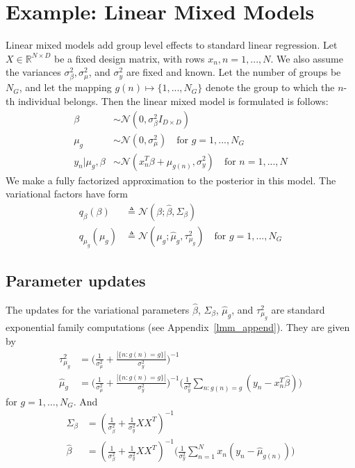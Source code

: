 \documentclass{article}
\begin{document}
\section{Example: Linear Mixed Models} 
Linear mixed models add group level effects to standard linear regression. Let $X\in \mathbb{R}^{N\times D}$ be a fixed design matrix, with rows $x_n, n = 1,..., N$. We also assume the variances $\sigma^2_\beta, \sigma^2_\mu$, and $\sigma^2_y$ are fixed and known. Let the number of groups be $N_G$, and let the mapping $g(n)\mapsto \{1, ..., N_G\}$ denote the group to which the $n$-th individual belongs. Then the linear mixed model is formulated is follows: 
\begin{align}
\beta &\sim \mathcal N(0, \sigma^2_\beta I_{D\times D}) \label{eq:lmm_prior1}\\
\mu_g &\sim \mathcal N(0, \sigma^2_\mu) \quad \text{for $g= 1, ..., N_G$} \label{eq:lmm_prior2}\\
y_n | \mu_g, \beta &\sim \mathcal N (x_n^T\beta + \mu_{g(n)}, \sigma^2_y)\quad \text{for $n = 1, ..., N$}\label{eq:lmm_LH}
\end{align}
We make a fully factorized approximation to the posterior in this model. The variational factors have form 
\begin{align}
q_\beta(\beta) &\triangleq \mathcal N (\beta; \hat \beta, \Sigma_\beta)\\
q_{\mu_g}(\mu_g) &\triangleq \mathcal{N}(\mu_g; \hat\mu_g, \tau^2_{\mu_g}) \quad \text{for }g = 1, ..., N_G
\end{align}

\subsection{Parameter updates}
The updates for the variational parameters $\hat\beta$, $\Sigma_\beta$, $\hat\mu_g$, and $\tau^2_{\mu_g}$ are standard exponential family computations (see Appendix~\ref{lmm_append}). They are given by 
\begin{align}
{\tau^2_{\mu_g}} &= \Big(\frac{1}{\sigma^2_\mu} + \frac{|\{n : g(n) = g\}|}{\sigma^2_y}\Big)^{-1}\\
{\hat\mu_g} &= \Big(\frac{1}{\sigma^2_\mu} + \frac{|\{n : g(n) = g\}|}{\sigma^2_y}\Big)^{-1}\Big(\frac{1}{\sigma^2_y}\sum_{n: g(n) = g} (y_n - x_n^T\hat\beta)\Big) \label{eq:lmm_mu_upd}
\end{align}
for $g = 1, ..., N_G$. And 
\begin{align}
\Sigma_\beta &= (\frac{1}{\sigma^2_\beta} + \frac{1}{\sigma^2_y}XX^T)^{-1}\\
\hat\beta &= (\frac{1}{\sigma^2_\beta} + \frac{1}{\sigma^2_y}XX^T)^{-1}\Big(\frac{1}{\sigma^2_y}\sum_{n=1}^N  x_n(y_n - \hat\mu_{g(n)} )\Big)
\end{align}
\end{document}
